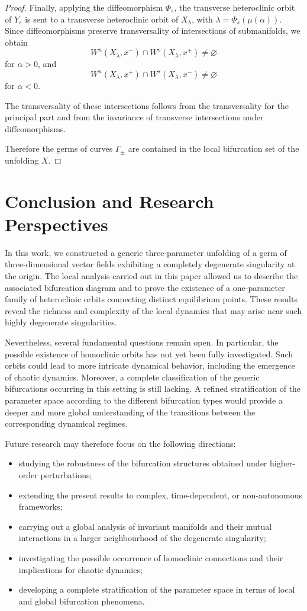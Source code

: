 \documentclass[12pt]{article}
\newtheorem{remark definition}{Remark Definition}[section]
\begin{document}
\begin{proof}
	Finally, applying the diffeomorphism $\Phi_s$, the transverse
	heteroclinic orbit of $Y_s$ is sent to a transverse heteroclinic orbit of
	$X_\lambda$, with $\lambda=\Phi_s(\mu(\alpha)).$
	Since diffeomorphisms preserve transversality of intersections of
	submanifolds, we obtain
	$$
	W^u(X_\lambda,x^-)
	\cap
	W^s(X_\lambda,x^+)
	\neq \varnothing
	$$
	for $\alpha>0$, and
	$$
	W^u(X_\lambda,x^+)
	\cap
	W^s(X_\lambda,x^-)
	\neq \varnothing
	$$
	for $\alpha<0$.
	
	The transversality of these intersections follows from the transversality
	for the principal part and from the invariance of transverse intersections
	under diffeomorphisms.
	
	Therefore the germs of curves $\Gamma_\pm$ are contained in the local
	bifurcation set of the unfolding $X$.
\end{proof}

\section{Conclusion and Research Perspectives}

In this work, we constructed a generic three-parameter unfolding of a germ
of three-dimensional vector fields exhibiting a completely degenerate
singularity at the origin. The local analysis carried out in this paper
allowed us to describe the associated bifurcation diagram and to prove the
existence of a one-parameter family of heteroclinic orbits connecting
distinct equilibrium points. These results reveal the richness and
complexity of the local dynamics that may arise near such highly
degenerate singularities.

Nevertheless, several fundamental questions remain open. In particular,
the possible existence of homoclinic orbits has not yet been fully
investigated. Such orbits could lead to more intricate dynamical behavior,
including the emergence of chaotic dynamics. Moreover, a complete
classification of the generic bifurcations occurring in this setting is
still lacking. A refined stratification of the parameter space according
to the different bifurcation types would provide a deeper and more global
understanding of the transitions between the corresponding dynamical
regimes.

Future research may therefore focus on the following directions:
\begin{itemize}
	\item studying the robustness of the bifurcation structures obtained
	under higher-order perturbations;
	\item extending the present results to complex, time-dependent, or
	non-autonomous frameworks;
	\item carrying out a global analysis of invariant manifolds and their
	mutual interactions in a larger neighbourhood of the degenerate
	singularity;
	\item investigating the possible occurrence of homoclinic connections
	and their implications for chaotic dynamics;
	\item developing a complete stratification of the parameter space in
	terms of local and global bifurcation phenomena.
\end{itemize}
\end{document}
